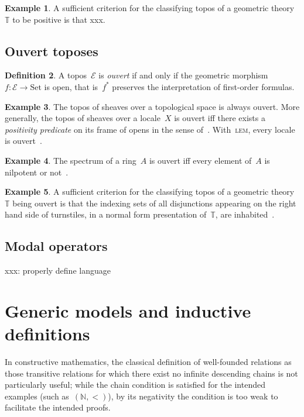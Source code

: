 \documentclass[oneside,reqno]{amsart}
\theoremstyle{definition}
\newtheorem{defn}{Definition}[section]
\newtheorem{ex}[defn]{Example}
\theoremstyle{plain}
\theoremstyle{remark}
\newcommand{\E}{\mathcal{E}}
\newcommand{\NN}{\mathbb{N}}
\newcommand{\TT}{\mathbb{T}}
\newcommand{\Set}{\mathrm{Set}}
\renewcommand{\_}{\mathpunct{.}\,}
\newcommand{\?}{\,{:}\,}
\begin{document}
\begin{ex}A sufficient criterion for the classifying topos of a geometric
theory~$\TT$ to be positive is that xxx.\end{ex}


\subsection{Ouvert toposes}

\begin{defn}A topos~$\E$ is \emph{ouvert} if and only if the geometric
morphism~$f : \E \to \Set$ is open, that is~$f^*$ preserves the interpretation of
first-order formulas.\end{defn}

\begin{ex}The topos of sheaves over a topological space is always ouvert. More
generally, the topos of sheaves over a locale~$X$ is ouvert iff there exists a
\emph{positivity predicate} on its frame of opens in the sense of~\cite{xxx}.
With~\textsc{lem}, every locale is ouvert~\cite{xxx}.\end{ex}

\begin{ex}The spectrum of a ring~$A$ is ouvert iff every element of~$A$ is
nilpotent or not~\cite[Proposition~12.51]{blechschmidt:phd}.\end{ex}

\begin{ex}A sufficient criterion for the classifying topos of a geometric
theory~$\TT$ being ouvert is that the indexing sets of all disjunctions
appearing on the right hand side of turnstiles, in a normal form presentation
of~$\TT$, are inhabited~\cite{xxx}.\end{ex}


\subsection{Modal operators}

xxx: properly define language


\section{Generic models and inductive definitions}
\label{sect:generic-models}

In constructive mathematics, the classical definition of well-founded relations
as those transitive relations for which there exist no infinite descending
chains is not particularly useful; while the chain condition is satisfied for
the intended examples (such as~$(\NN,{<})$), by its negativity the condition is too weak to
facilitate the intended proofs.
\end{document}
